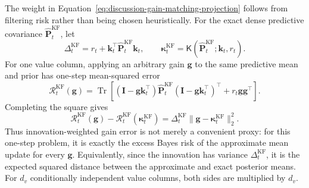 \documentclass[11pt]{article}
\newcommand{\vct}[1]{\boldsymbol{#1}}
\begin{document}
The weight in Equation~\eqref{eq:discussion-gain-matching-projection} follows from filtering risk
rather than being chosen heuristically. For the exact dense predictive covariance
$\widehat{\vct{P}}_t^{\mathrm{KF}}$, let
\begin{equation}
  \Delta_t^{\mathrm{KF}}
  =r_t+\vct{k}_t^\top\widehat{\vct{P}}_t^{\mathrm{KF}}\vct{k}_t,
  \qquad
  \vct{\kappa}_t^{\mathrm{KF}}
  =\mathsf{K}(\widehat{\vct{P}}_t^{\mathrm{KF}};\vct{k}_t,r_t).
  \label{eq:discussion-exact-gain-target}
\end{equation}
For one value column, applying an arbitrary gain $\vct{g}$ to the same predictive mean and prior
has one-step mean-squared error
\begin{equation}
  \mathcal{R}_t^{\mathrm{KF}}(\vct{g})
  =\operatorname{Tr}\!\left[
    (\vct{I}-\vct{g}\vct{k}_t^\top)
    \widehat{\vct{P}}_t^{\mathrm{KF}}
    (\vct{I}-\vct{g}\vct{k}_t^\top)^\top
    +r_t\vct{g}\vct{g}^\top
  \right].
  \label{eq:discussion-exact-gain-risk}
\end{equation}
Completing the square gives
\begin{equation}
  \mathcal{R}_t^{\mathrm{KF}}(\vct{g})
  -\mathcal{R}_t^{\mathrm{KF}}(\vct{\kappa}_t^{\mathrm{KF}})
  =\Delta_t^{\mathrm{KF}}
   \|\vct{g}-\vct{\kappa}_t^{\mathrm{KF}}\|_2^2.
  \label{eq:discussion-excess-risk-gain-distance}
\end{equation}
Thus innovation-weighted gain error is not merely a convenient proxy: for this one-step problem,
it is exactly the excess Bayes risk of the approximate mean update for every $\vct{g}$.
Equivalently, since the innovation has variance
$\Delta_t^{\mathrm{KF}}$, it is the expected squared distance between the approximate and exact posterior
means. For $d_v$ conditionally independent value columns, both sides are multiplied by $d_v$.
\end{document}
